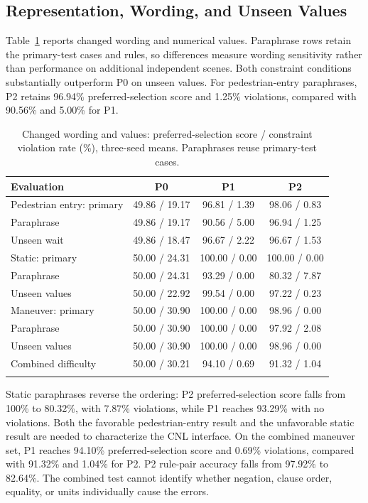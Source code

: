 \subsection{Representation, Wording, and Unseen Values}\label{sec:results-robustness}

Table~\ref{tab:results-robustness} reports changed wording and numerical values.
Paraphrase rows retain the primary-test cases and rules, so differences
measure wording sensitivity rather than performance on additional independent
scenes. Both constraint conditions substantially outperform P0 on unseen
values. For pedestrian-entry paraphrases, P2 retains 96.94\% preferred-selection score and
1.25\% violations, compared with 90.56\% and 5.00\% for P1.

\begin{table}[tbp]
\caption{Changed wording and values: preferred-selection score / constraint violation rate (\%),
three-seed means. Paraphrases reuse primary-test cases.}
\label{tab:results-robustness}
\centering\footnotesize
\setlength{\tabcolsep}{3pt}
\begin{tabular*}{\textwidth}{@{\extracolsep\fill}lccc@{}}
\toprule
Evaluation & P0 & P1 & P2\\
\midrule
Pedestrian entry: primary & 49.86 / 19.17 & 96.81 / 1.39 & 98.06 / 0.83\\
\quad Paraphrase & 49.86 / 19.17 & 90.56 / 5.00 & 96.94 / 1.25\\
\quad Unseen wait & 49.86 / 18.47 & 96.67 / 2.22 & 96.67 / 1.53\\[3pt]
Static: primary & 50.00 / 24.31 & 100.00 / 0.00 & 100.00 / 0.00\\
\quad Paraphrase & 50.00 / 24.31 & 93.29 / 0.00 & 80.32 / 7.87\\
\quad Unseen values & 50.00 / 22.92 & 99.54 / 0.00 & 97.22 / 0.23\\[3pt]
Maneuver: primary & 50.00 / 30.90 & 100.00 / 0.00 & 98.96 / 0.00\\
\quad Paraphrase & 50.00 / 30.90 & 100.00 / 0.00 & 97.92 / 2.08\\
\quad Unseen values & 50.00 / 30.90 & 100.00 / 0.00 & 98.96 / 0.00\\
\quad Combined difficulty & 50.00 / 30.21 & 94.10 / 0.69 & 91.32 / 1.04\\
\botrule
\end{tabular*}
\end{table}

Static paraphrases reverse the ordering: P2 preferred-selection score falls from 100\% to
80.32\%, with 7.87\% violations, while P1 reaches 93.29\% with no violations.
Both the favorable pedestrian-entry result and the unfavorable static result
are needed to characterize the CNL interface. On the combined maneuver set,
P1 reaches 94.10\% preferred-selection score and 0.69\% violations, compared with 91.32\% and
1.04\% for P2. P2 rule-pair accuracy falls from 97.92\% to 82.64\%.
The combined test cannot identify whether negation, clause order, equality,
or units individually cause the errors.

